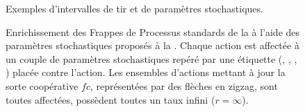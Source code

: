 \begin{example}
\begin{figure}[p]
\begin{center}
\begin{tikzpicture}[plot]
% 
%     
%     
  \end{tikzpicture}
  \end{center}
  \caption{%
    Exemples d'intervalles de tir et de paramètres stochastiques.
  }
  \end{figure}
  
  \begin{figure}[p]
  \begin{center}
  \caption{%
    Enrichissement des Frappes de Processus standards de la 
    à l'aide des paramètres stochastiques proposés à la .
    Chaque action est affectée à un couple de paramètres stochastiques repéré
    par une étiquette (\stochainf, \stochaa, \stochab, \stochac) placée contre l'action.
    Les ensembles d'actions mettant à jour la sorte coopérative $fc$,
    représentées par des flèches en zigzag, sont toutes affectées,
    possèdent toutes un taux infini ($r = \infty$).
  }
  \end{center}
  \end{figure}
\end{example}

